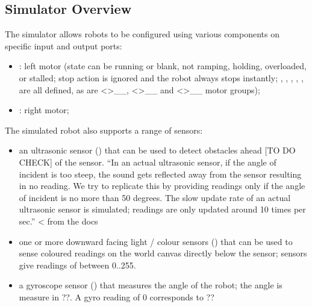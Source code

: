 \documentclass[letterpaper,10pt,english]{sphinxmanual}
\begin{document}
\subsection{Simulator Overview}
\label{\detokenize{content/00_SOFTWARE_GUIDE/Section_00_02_ev3devsim_simulator_overview:Simulator-Overview}}
The  simulator allows robots to be configured using various components on specific input and output ports:
\begin{itemize}
\item {} 
: left motor (state can be running or blank, not ramping, holding, overloaded, or stalled; stop action is ignored and the robot always stops instantly; , , , , ,  are all defined, as are  \textless{}\textgreater{}\textasciigrave{}\_\_,
 \textless{}\textgreater{}\textasciigrave{}\_\_ and  \textless{}\textgreater{}\textasciigrave{}\_\_ motor groups);

\item {} 
: right motor;

\end{itemize}

The simulated robot also supports a range of sensors:
\begin{itemize}
\item {} 
an ultrasonic sensor () that can be used to detect obstacles ahead {[}TO DO \sphinxhyphen{} CHECK{]} of the sensor. “In an actual ultrasonic sensor, if the angle of incident is too steep, the sound gets reflected away from the sensor resulting in no reading. We try to replicate this by providing readings only if the angle of incident is no more than 50 degrees. The slow update rate of an actual ultrasonic sensor is simulated; readings are only updated around 10 times per sec.” \textless{}\sphinxhyphen{} from the
docs

\item {} 
one or more downward facing light / colour sensors () that can be used to sense coloured readings on the world canvas directly below the sensor; sensors give readings of between 0..255.

\item {} 
a gyroscope sensor () that measures the angle of the robot; the angle is measure in ??. A gyro reading of 0 corresponds to ??

\end{itemize}
\end{document}
